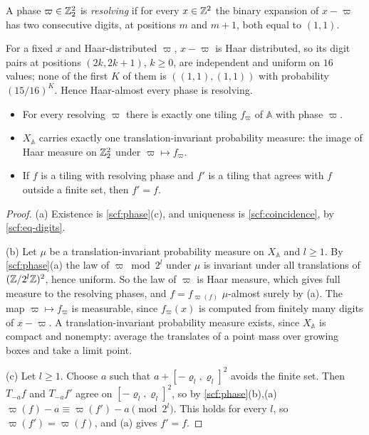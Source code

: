 \begin{definition}\label{scf:def-resolving}
A phase $\varpi\in\mathbb{Z}_2^2$ is \emph{resolving} if for every $x\in\mathbb{Z}^2$ the binary expansion of $x-\varpi$ has two consecutive digits, at positions $m$ and $m+1$, both equal to $(1,1)$.
\end{definition}

For a fixed $x$ and Haar-distributed $\varpi$, $x-\varpi$ is Haar distributed, so its digit pairs at positions $(2k,2k+1)$, $k\ge0$, are independent and uniform on $16$ values; none of the first $K$ of them is $((1,1),(1,1))$ with probability $(15/16)^K$. Hence Haar-almost every phase is resolving.

\begin{proposition}\label{prop:scaffold-ti}
\begin{itemize}
\item[(a)] For every resolving $\varpi$ there is exactly one tiling $f_\varpi$ of $\mathbb A$ with phase $\varpi$.
\item[(b)] $X_{\mathbb A}$ carries exactly one translation-invariant probability measure: the image of Haar measure on $\mathbb{Z}_2^2$ under $\varpi\mapsto f_\varpi$.
\item[(c)] If $f$ is a tiling with resolving phase and $f'$ is a tiling that agrees with $f$ outside a finite set, then $f'=f$.
\end{itemize}
\end{proposition}

\begin{proof}
(a) Existence is \cref{scf:phase}(c), and uniqueness is \cref{scf:coincidence}, by \eqref{scf:eq-digits}.

(b) Let $\mu$ be a translation-invariant probability measure on $X_{\mathbb A}$ and $l\ge1$. By \cref{scf:phase}(a) the law of $\varpi\bmod2^l$ under $\mu$ is invariant under all translations of $(\mathbb{Z}/2^l\mathbb{Z})^2$, hence uniform. So the law of $\varpi$ is Haar measure, which gives full measure to the resolving phases, and $f=f_{\varpi(f)}$ $\mu$-almost surely by (a). The map $\varpi\mapsto f_\varpi$ is measurable, since $f_\varpi(x)$ is computed from finitely many digits of $x-\varpi$. A translation-invariant probability measure exists, since $X_{\mathbb A}$ is compact and nonempty: average the translates of a point mass over growing boxes and take a limit point.

(c) Let $l\ge1$. Choose $a$ such that $a+[-\varrho_l,\varrho_l]^2$ avoids the finite set. Then $T_{-a}f$ and $T_{-a}f'$ agree on $[-\varrho_l,\varrho_l]^2$, so by \cref{scf:phase}(b),(a) $\varpi(f)-a\equiv\varpi(f')-a\pmod{2^l}$. This holds for every $l$, so $\varpi(f')=\varpi(f)$, and (a) gives $f'=f$.
\end{proof}

